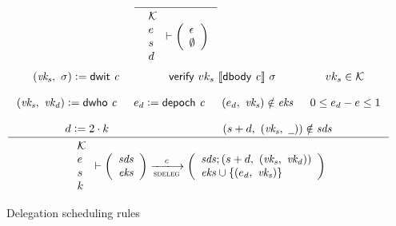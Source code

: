 \begin{figure}[htb]
  \begin{equation}
    \inference
    {
    }
    {
      {\begin{array}{l}
       \mathcal{K}\\
        e\\
        s\\
        d
      \end{array}}
      \vdash
      \left(
        \begin{array}{l}
          \epsilon\\
          \emptyset
        \end{array}
      \right)
    }
  \end{equation}
  \nextdef
  \begin{equation}
    \label{eq:rule:delegation-scheduling}
    \inference
    {
      (\var{vk_s},~ \sigma) \leteq \dwit{c}
      & \verify{vk_s}{\serialised{\dbody{c}}}{\sigma} & vk_s \in \mathcal{K}\\ ~ \\
      (\var{vk_s},~ \var{vk_d}) \leteq \dwho{c} & e_d \leteq \depoch{c}
      & (e_d,~ \var{vk_s}) \notin \var{eks} & 0 \leq e_d - e \leq 1 \\ ~ \\
      d \leteq 2 \cdot k & (s + d,~ (\var{vk_s},~ \wcard)) \notin \var{sds}\\
    }
    {
      {\begin{array}{l}
       \mathcal{K}\\
        e\\
        s\\
        k
      \end{array}}
      \vdash
      {
        \left(
          \begin{array}{l}
            \var{sds}\\
            \var{eks}
          \end{array}
        \right)
      }
      \trans{sdeleg}{c}
      {
        \left(
          \begin{array}{l}
            \var{sds}; (s + d,~ (\var{vk_s},~ \var{vk_d}))\\
            \var{eks} \cup \{(e_d,~ \var{vk_s})\}
          \end{array}
        \right)
      }
    }
  \end{equation}
  \caption{Delegation scheduling rules}
  \label{fig:rules:delegation-scheduling}
\end{figure}

